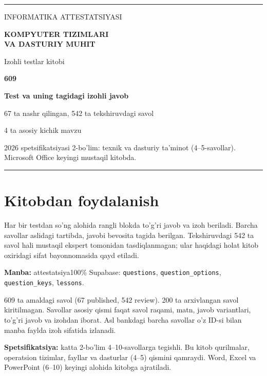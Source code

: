 \documentclass[10pt,a4paper]{article}
\begin{document}
\begin{titlepage}
\vspace*{27mm}
{\color{teal}\rule{\textwidth}{2pt}}\par
\vspace{21mm}
{\large\sffamily INFORMATIKA ATTESTATSIYASI }\par
\vspace{13mm}
{\fontsize{24}{30}\selectfont\bfseries\sffamily\color{ink}KOMPYUTER TIZIMLARI\\VA DASTURIY MUHIT}\par
\vspace{8mm}
{\large Izohli testlar kitobi}\par
\vspace{18mm}
{\Huge\bfseries\color{teal}609}\par
{\large\bfseries Test va uning tagidagi izohli javob}\par
\vspace{12mm}
67 ta nashr qilingan, 542 ta tekshiruvdagi savol\par
4 ta asosiy kichik mavzu\par
\vfill
{\color{muted}2026 spetsifikatsiyasi 2-bo'lim: texnik va dasturiy ta'minot (4--5-savollar).\\
Microsoft Office keyingi mustaqil kitobda.}\par
\vspace{10mm}
{\color{teal}\rule{\textwidth}{2pt}}\par
\end{titlepage}
\section*{Kitobdan foydalanish}
Har bir testdan so'ng alohida rangli blokda to'g'ri javob va izoh beriladi.
Barcha savollar aslidagi tartibda, javobi bevosita tagida berilgan.
Tekshiruvdagi 542 ta savol hali mustaqil ekspert tomonidan tasdiqlanmagan; ular haqidagi holat kitob oxiridagi sifat bayonnomasida qayd etiladi.
\par\textbf{Manba:} attestatsiya100\% Supabase: \texttt{questions}, \texttt{question\_options},
\texttt{question\_keys}, \texttt{lessons}.
\par 609 ta amaldagi savol (67 published, 542 review). 200 ta arxivlangan savol kiritilmagan.
Savollar asosiy qismi faqat savol raqami, matn, javob variantlari, to'g'ri javob va izohdan iborat. Asl bankdagi barcha savollar o'z ID-si bilan manba faylda izoh sifatida izlanadi.
\par\textbf{Spetsifikatsiya:} katta 2-bo'lim 4--10-savollarga tegishli.
Bu kitob qurilmalar, operatsion tizimlar, fayllar va dasturlar (4--5) qismini qamraydi.
Word, Excel va PowerPoint (6--10) keyingi alohida kitobga ajratiladi.
\tableofcontents
\clearpage
\end{document}
